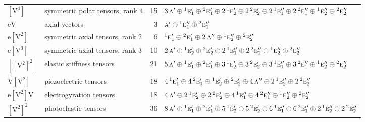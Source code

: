 \documentclass[10pt,a4paper]{article}
\numberwithin{equation}{section}
\newcommand{\irr}[1]{\text{\normalfont\scshape #1}}
\newcommand{\conjpair}[1]{{}^{#1}}
\newcommand{\jahn}[1]{\mathrm{#1}}
\newlength{\fillwidth}\newlength{\cellwidth}\newlength{\colwidth}
\begin{document}
{\begin{longtable}{@{}llr>{\RaggedRight\arraybackslash}p{\fillwidth}@{}}
$\jahn{[V^{4}]}$ & symmetric polar tensors, rank 4 & 15 & $3\,\irr{a}' \oplus\allowbreak \conjpair{1}\irr{e}_{1}' \oplus\allowbreak \conjpair{2}\irr{e}_{1}' \oplus\allowbreak 2\,\conjpair{1}\irr{e}_{2}' \oplus\allowbreak 2\,\conjpair{2}\irr{e}_{2}' \oplus\allowbreak 2\,\conjpair{1}\irr{e}_{1}'' \oplus\allowbreak 2\,\conjpair{2}\irr{e}_{1}'' \oplus\allowbreak \conjpair{1}\irr{e}_{2}'' \oplus\allowbreak \conjpair{2}\irr{e}_{2}''$\\
$\jahn{eV}$ & axial vectors & 3 & $\irr{a}' \oplus\allowbreak \conjpair{1}\irr{e}_{1}'' \oplus\allowbreak \conjpair{2}\irr{e}_{1}''$\\
$\jahn{e[V^{2}]}$ & symmetric axial tensors, rank 2 & 6 & $\conjpair{1}\irr{e}_{1}' \oplus\allowbreak \conjpair{2}\irr{e}_{1}' \oplus\allowbreak 2\,\irr{a}'' \oplus\allowbreak \conjpair{1}\irr{e}_{2}'' \oplus\allowbreak \conjpair{2}\irr{e}_{2}''$\\
$\jahn{e[V^{3}]}$ & symmetric axial tensors, rank 3 & 10 & $2\,\irr{a}' \oplus\allowbreak \conjpair{1}\irr{e}_{2}' \oplus\allowbreak \conjpair{2}\irr{e}_{2}' \oplus\allowbreak 2\,\conjpair{1}\irr{e}_{1}'' \oplus\allowbreak 2\,\conjpair{2}\irr{e}_{1}'' \oplus\allowbreak \conjpair{1}\irr{e}_{2}'' \oplus\allowbreak \conjpair{2}\irr{e}_{2}''$\\
$\jahn{[[V^{2}]^{2}]}$ & elastic stiffness tensors & 21 & $5\,\irr{a}' \oplus\allowbreak \conjpair{1}\irr{e}_{1}' \oplus\allowbreak \conjpair{2}\irr{e}_{1}' \oplus\allowbreak 3\,\conjpair{1}\irr{e}_{2}' \oplus\allowbreak 3\,\conjpair{2}\irr{e}_{2}' \oplus\allowbreak 3\,\conjpair{1}\irr{e}_{1}'' \oplus\allowbreak 3\,\conjpair{2}\irr{e}_{1}'' \oplus\allowbreak \conjpair{1}\irr{e}_{2}'' \oplus\allowbreak \conjpair{2}\irr{e}_{2}''$\\
$\jahn{V[V^{2}]}$ & piezoelectric tensors & 18 & $4\,\conjpair{1}\irr{e}_{1}' \oplus\allowbreak 4\,\conjpair{2}\irr{e}_{1}' \oplus\allowbreak \conjpair{1}\irr{e}_{2}' \oplus\allowbreak \conjpair{2}\irr{e}_{2}' \oplus\allowbreak 4\,\irr{a}'' \oplus\allowbreak 2\,\conjpair{1}\irr{e}_{2}'' \oplus\allowbreak 2\,\conjpair{2}\irr{e}_{2}''$\\
$\jahn{e[V^{2}]V}$ & electrogyration tensors & 18 & $4\,\irr{a}' \oplus\allowbreak 2\,\conjpair{1}\irr{e}_{2}' \oplus\allowbreak 2\,\conjpair{2}\irr{e}_{2}' \oplus\allowbreak 4\,\conjpair{1}\irr{e}_{1}'' \oplus\allowbreak 4\,\conjpair{2}\irr{e}_{1}'' \oplus\allowbreak \conjpair{1}\irr{e}_{2}'' \oplus\allowbreak \conjpair{2}\irr{e}_{2}''$\\
$\jahn{[V^{2}]^{2}}$ & photoelastic tensors & 36 & $8\,\irr{a}' \oplus\allowbreak \conjpair{1}\irr{e}_{1}' \oplus\allowbreak \conjpair{2}\irr{e}_{1}' \oplus\allowbreak 5\,\conjpair{1}\irr{e}_{2}' \oplus\allowbreak 5\,\conjpair{2}\irr{e}_{2}' \oplus\allowbreak 6\,\conjpair{1}\irr{e}_{1}'' \oplus\allowbreak 6\,\conjpair{2}\irr{e}_{1}'' \oplus\allowbreak 2\,\conjpair{1}\irr{e}_{2}'' \oplus\allowbreak 2\,\conjpair{2}\irr{e}_{2}''$\\

\end{longtable}}
\end{document}

